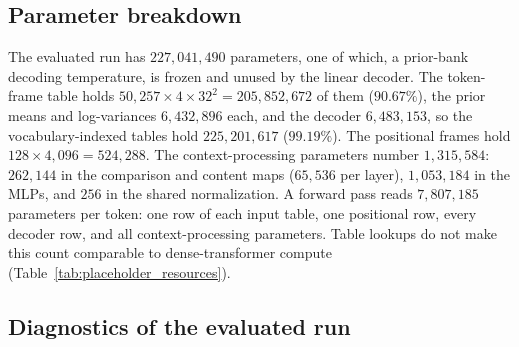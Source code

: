 \documentclass[twoside,11pt]{article}
\begin{document}
\subsection{Parameter breakdown}
\label{app:run_parameters}

The evaluated run has $227{,}041{,}490$ parameters, %
one of which, a prior-bank decoding temperature, is frozen and unused by the linear decoder. %
The token-frame table holds $50{,}257\times4\times32^2=205{,}852{,}672$ of them ($90.67\%$), the prior means and log-variances $6{,}432{,}896$ each, and the decoder $6{,}483{,}153$, so the vocabulary-indexed tables hold $225{,}201{,}617$ ($99.19\%$). %
The positional frames hold $128\times4{,}096=524{,}288$. %
The context-processing parameters number $1{,}315{,}584$: $262{,}144$ in the comparison and content maps ($65{,}536$ per layer), $1{,}053{,}184$ in the MLPs, and $256$ in the shared normalization. %
A forward pass reads $7{,}807{,}185$ parameters per token: one row of each input table, one positional row, every decoder row, and all context-processing parameters. %
Table lookups do not make this count comparable to dense-transformer compute (Table~\ref{tab:placeholder_resources}).

\subsection{Diagnostics of the evaluated run}
\label{app:run_diagnostics}
\end{document}
